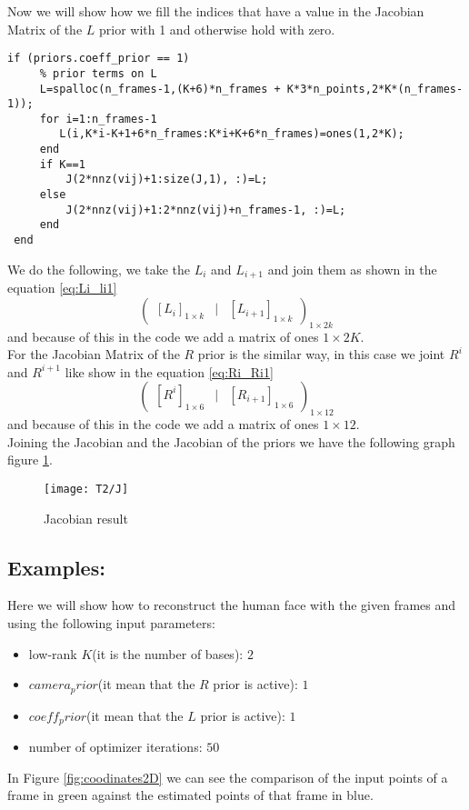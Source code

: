 \noindent Now we will show how we fill the indices that have a value in the Jacobian Matrix of the $L$ prior with 1 and otherwise hold with zero.\\
\begin{lstlisting}[style=Matlab-editor]
if (priors.coeff_prior == 1)
     % prior terms on L
     L=spalloc(n_frames-1,(K+6)*n_frames + K*3*n_points,2*K*(n_frames-1));     
     for i=1:n_frames-1
        L(i,K*i-K+1+6*n_frames:K*i+K+6*n_frames)=ones(1,2*K);        
     end
     if K==1
         J(2*nnz(vij)+1:size(J,1), :)=L;
     else
         J(2*nnz(vij)+1:2*nnz(vij)+n_frames-1, :)=L;
     end
 end 
\end{lstlisting}
\noindent We do the following, we take the $L_{i}$ and $L_{i+1}$ and join them as shown in the equation \ref{eq:Li_li1}
\begin{equation}\label{eq:Li_li1}
\begin{pmatrix}
[L_{i}]_{1\times k} & | & [L_{i+1}]_{1\times k}
\end{pmatrix}_{1\times 2k}
\end{equation}
\noindent and because of this in the code we add a matrix of ones $1\times 2K$.\\
\noindent For the Jacobian Matrix of the $R$ prior is the similar way, in this case we joint $R^{i}$ and $R^{i+1}$ like show in the equation \ref{eq:Ri_Ri1}
\begin{equation}\label{eq:Ri_Ri1}
\begin{pmatrix}
[R^{i}]_{1\times 6} & | & [R_{i+1}]_{1\times 6}
\end{pmatrix}_{1\times 12}
\end{equation}
\noindent and because of this in the code we add a matrix of ones $1\times 12$.\\
Joining the Jacobian and the Jacobian of the priors we have the following graph figure \ref{fig:J}.

\begin{figure}[h]
    \centering
    \texttt{[image: T2/J]}
    \caption{Jacobian result}
    \label{fig:J}
\end{figure}

\subsection{Examples:}
\noindent Here we will show how to reconstruct the human face with the given frames and using the following input parameters:

\begin{itemize}
\item low-rank $K$(it is the number of bases): $2$
\item $camera_prior$(it mean that the $R$ prior is active): $1$
\item $coeff_prior$(it mean that the $L$ prior is active): $1$
\item number of optimizer iterations: $50$
\end{itemize}
\noindent In Figure \ref{fig:coodinates2D} we can see the comparison of the input points of a frame in green against the estimated points of that frame in blue.\\

